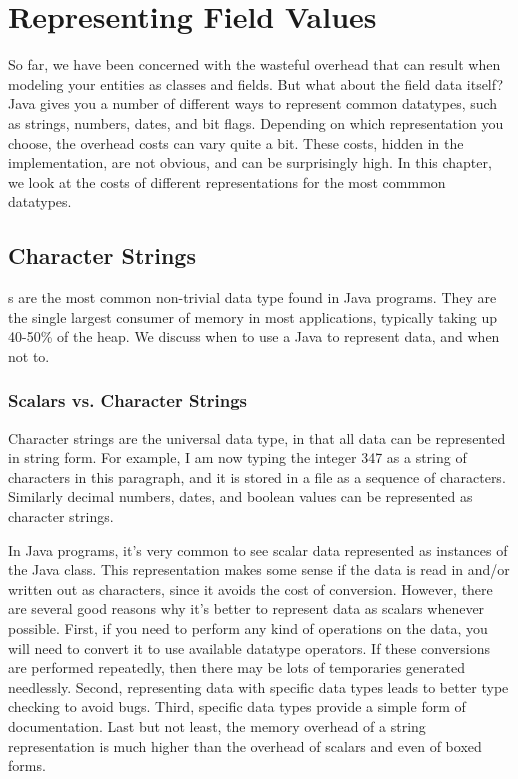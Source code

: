 \chapter{Representing Field Values}
\label{chapter:representing-values}

So far, we have been concerned with the wasteful overhead that can result when
modeling your entities as classes and fields. But what about the field data
itself? Java gives you a number of different ways to represent common datatypes, such
as strings, numbers, dates, and bit flags. Depending on which
representation you choose, the overhead costs can vary quite a bit. 
These costs, hidden in the implementation, are not obvious, and can be
surprisingly high.
In this chapter, we look at the costs of different representations for the most 
commmon datatypes.

\section{Character Strings}
s are the most common non-trivial data type found in Java
programs. They are the single largest consumer of memory in most applications,
typically taking up 40-50\% of the heap. We discuss when to use a Java  to
represent data, and when not to.

\subsection{Scalars vs. Character Strings}
Character strings are the universal data type, in that all data can be
represented in string form.  For example, I am now typing the integer 347 as a
string of characters in this paragraph, and it is stored in a file as a sequence
of characters. Similarly decimal numbers, dates, and boolean values can be
represented as character strings.
 
In Java programs, it's very common to see scalar data represented as instances
of the Java  class. This representation makes some sense if the
data is read in and/or written out as characters, since it avoids the
cost of conversion. However, there are several good reasons why it's better
to represent data as scalars whenever possible. First, if you need to perform
any kind of operations on the data, you will need to convert it to use
available datatype operators. If these conversions are performed
repeatedly, then there may be lots of temporaries generated needlessly.  Second,
representing data with specific data types leads to better type checking to avoid bugs. 
Third, specific data types provide a simple form of documentation.
Last but not least, the memory overhead of a string representation is much
higher than the overhead of scalars and even of boxed forms.

